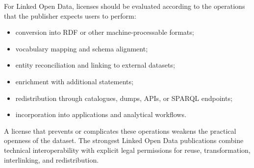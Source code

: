 \documentclass{scrbook}
\begin{document}
	For Linked Open Data, licenses should be evaluated according to the operations that the publisher expects users to perform:
	
	\begin{itemize}
	    \item conversion into RDF or other machine-processable formats;
	    \item vocabulary mapping and schema alignment;
	    \item entity reconciliation and linking to external datasets;
	    \item enrichment with additional statements;
	    \item redistribution through catalogues, dumps, APIs, or SPARQL endpoints;
	    \item incorporation into applications and analytical workflows.
	\end{itemize}
	
	A license that prevents or complicates these operations weakens the practical openness of the dataset. The strongest Linked Open Data publications combine technical interoperability with explicit legal permissions for reuse, transformation, interlinking, and redistribution.
\end{document}
